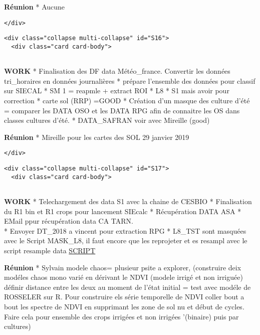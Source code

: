 \documentclass[11pt]{article}
\begin{document}
\textbf{Réunion} * Aucune

\begin{verbatim}
</div>
\end{verbatim}

\begin{verbatim}
<div class="collapse multi-collapse" id="S16">
  <div class="card card-body">
      
\end{verbatim}

\textbf{WORK} * Finalisation des DF data Météo\_france. Convertir les
données tri\_horaires en données journalières * prépare l'ensemble des
données pour classif sur SIECAL * SM 1 = reapmle + extract ROI * L8 * S1
mais avoir pour correction * carte sol (RRP) =GOOD * Création d'un
masque des culture d'été = comparer les DATA OSO et les DATA RPG afin de
connaitre les OS dans classes cultures d'été. * DATA\_SAFRAN voir avec
Mireille (good)

\textbf{Réunion} * Mireille pour les cartes des SOL 29 janvier 2019

\begin{verbatim}
</div>
\end{verbatim}

\begin{verbatim}
<div class="collapse multi-collapse" id="S17">
  <div class="card card-body">
      
\end{verbatim}

\textbf{WORK} * Telechargement des data S1 avec la chaine de CESBIO *
Finalisation du R1 bin et R1 crops pour lancement SIEcalc * Récupération
DATA ASA * EMail ppur récupération data CA TARN.\\
* Envoyer DT\_2018 a vincent pour extraction RPG * L8\_TST sont masquées
avec le Script MASK\_L8, il faut encore que les reprojeter et es resampl
avec le script resample data
\href{https://github.com/pageotyann/Code/blob/master/SCRIPT/python/MASK_L8_LST.py}{SCRIPT}

\textbf{Réunion} * Sylvain modele chaos= plusieur psite a explorer,
(construire deix modéles chaos mono varié en dérivant le NDVI (modele
irrigé et non irriguée) définir distance entre les deux au moment de
l'état initial = test avec modéle de ROSSELER sur R. Pour construire els
série temporelle de NDVI coller bout a bout les spectre de NDVI en
supprimant les zone de sol nu et début de cycles. Faire cela pour
ensemble des crops irrigées et non irrigées '(binaire) puis par
cultures)
\end{document}
